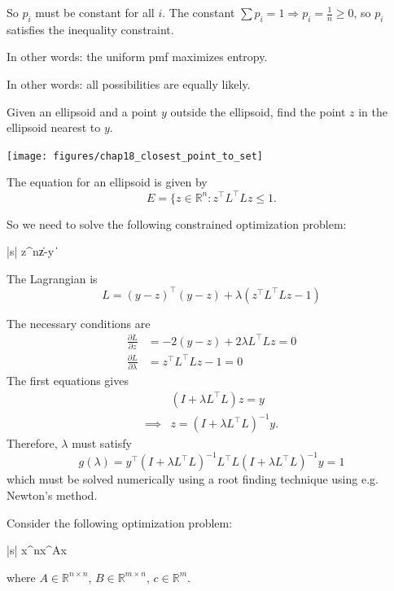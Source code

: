 \documentclass{article}
\newcommand{\norm}[1]{\left\|{#1}\right\|}
\begin{document}
	So $p_i$ must be constant for all $i$.  The constant $\sum p_i = 1 \Rightarrow p_i = \frac{1}{n} \geq 0$, so $p_i$ satisfies the inequality constraint.
	
	
	In other words: the uniform pmf maximizes entropy.
	
	
	In other words: all possibilities are equally likely.	

\par{}
	Given an ellipsoid and a point $y$ outside the ellipsoid, find the point $z$ in the ellipsoid nearest to $y$.\\
	\begin{center}
		\texttt{[image: figures/chap18\_closest\_point\_to\_set]}
	\end{center}
	The equation for an ellipsoid is given by
	\[ 
		E = \{ z\in \mathbb{R}^n : z^\top L^\top Lz \leq 1.
	\]	

	So we need to solve the following constrained optimization problem:
	\begin{mini*}|s|
		{z\in{}^n}{\norm{z-y }}{}{}
	\end{mini*}
	The Lagrangian is
	\[ 
		L = (y - z)^\top (y - z) + \lambda(z^\top L^\top Lz - 1) 
	\]
	
	The necessary conditions are
	\begin{align*}
		\frac{\partial L}{\partial z} &= -2(y - z) + 2\lambda L^\top Lz = 0 \\
		\frac{\partial L}{\partial \lambda} &= z^\top L^\top Lz - 1 = 0
	\end{align*}
	The first equations gives
	\begin{align*}
		& (I + \lambda L^\top L)z = y \\
		\implies & z = (I + \lambda L^\top L)^{-1}y.
	\end{align*}
	Therefore, $\lambda$ must satisfy
	\[ 
		g(\lambda) = y^\top (I+\lambda L^\top L)^{-1}L^\top L(I + \lambda L^\top L)^{-1}y = 1 
	\]
	which must be solved numerically using a  root finding technique using e.g. Newton's method.	


\par{}
	Consider the following optimization problem:
	\begin{mini*}|s|
		{x\in{}^n}{x^\top Ax}{}{}
	\end{mini*}		
	where $A\in\mathbb{R}^{n\times n}$, 
	$B\in\mathbb{R}^{m\times n}$, 
	$c \in \mathbb{R}^{m}$.
	
\end{document}
